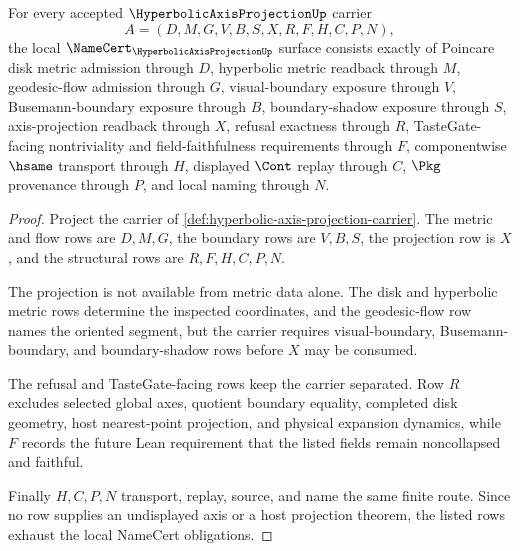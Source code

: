 \begin{theorem}
\label{thm:hyperbolic-axis-projection-namecert-obligations}
For every accepted $\HyperbolicAxisProjectionUp$ carrier
$$
A=(D,M,G,V,B,S,X,R,F,H,C,P,N),
$$
the local $\NameCert_{\HyperbolicAxisProjectionUp}$ surface consists exactly of Poincare disk metric admission through $D$, hyperbolic metric readback through $M$, geodesic-flow admission through $G$, visual-boundary exposure through $V$, Busemann-boundary exposure through $B$, boundary-shadow exposure through $S$, axis-projection readback through $X$, refusal exactness through $R$, TasteGate-facing nontriviality and field-faithfulness requirements through $F$, componentwise $\hsame$ transport through $H$, displayed $\Cont$ replay through $C$, $\Pkg$ provenance through $P$, and local naming through $N$.
\end{theorem}
\begin{proof}
Project the carrier of \autoref{def:hyperbolic-axis-projection-carrier}. The metric and flow rows are $D,M,G$, the boundary rows are $V,B,S$, the projection row is $X$, and the structural rows are $R,F,H,C,P,N$.

The projection is not available from metric data alone. The disk and hyperbolic metric rows determine the inspected coordinates, and the geodesic-flow row names the oriented segment, but the carrier requires visual-boundary, Busemann-boundary, and boundary-shadow rows before $X$ may be consumed.

The refusal and TasteGate-facing rows keep the carrier separated. Row $R$ excludes selected global axes, quotient boundary equality, completed disk geometry, host nearest-point projection, and physical expansion dynamics, while $F$ records the future Lean requirement that the listed fields remain noncollapsed and faithful.

Finally $H,C,P,N$ transport, replay, source, and name the same finite route. Since no row supplies an undisplayed axis or a host projection theorem, the listed rows exhaust the local NameCert obligations.
\end{proof}

